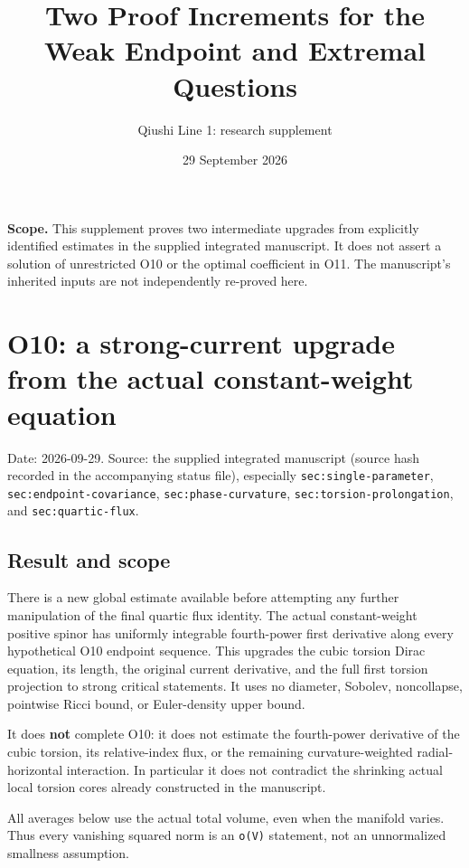 \documentclass[11pt]{article}
\title{Two Proof Increments for the Weak Endpoint and Extremal Questions}
\author{Qiushi Line 1: research supplement}
\date{29 September 2026}
\begin{document}
\maketitle
\noindent\textbf{Scope.} This supplement proves two intermediate upgrades from explicitly identified estimates in the supplied integrated manuscript. It does not assert a solution of unrestricted O10 or the optimal coefficient in O11. The manuscript's inherited inputs are not independently re-proved here.
\tableofcontents
\bigskip
\hypertarget{o10-a-strong-current-upgrade-from-the-actual-constant-weight-equation}{%
\section{O10: a strong-current upgrade from the actual constant-weight
equation}\label{o10-a-strong-current-upgrade-from-the-actual-constant-weight-equation}}

Date: 2026-09-29. Source:
the supplied integrated manuscript (source hash recorded in the accompanying status file), especially
\texttt{sec:single-parameter}, \texttt{sec:endpoint-covariance},
\texttt{sec:phase-curvature}, \texttt{sec:torsion-prolongation}, and
\texttt{sec:quartic-flux}.

\hypertarget{result-and-scope}{%
\subsection{Result and scope}\label{result-and-scope}}

There is a new global estimate available before attempting any further
manipulation of the final quartic flux identity. The actual
constant-weight positive spinor has uniformly integrable fourth-power
first derivative along every hypothetical O10 endpoint sequence. This
upgrades the cubic torsion Dirac equation, its length, the original
current derivative, and the full first torsion projection to strong
critical statements. It uses no diameter, Sobolev, noncollapse,
pointwise Ricci bound, or Euler-density upper bound.

It does \textbf{not} complete O10: it does not estimate the fourth-power
derivative of the cubic torsion, its relative-index flux, or the
remaining curvature-weighted radial-horizontal interaction. In
particular it does not contradict the shrinking actual local torsion
cores already constructed in the manuscript.

All averages below use the actual total volume, even when the manifold
varies. Thus every vanishing squared norm is an \texttt{o(V)} statement,
not an unnormalized smallness assumption.
\end{document}
